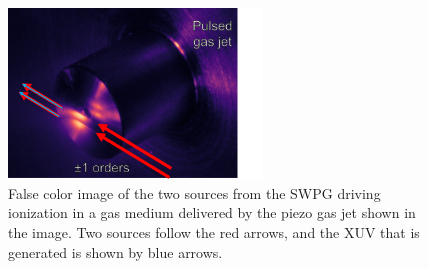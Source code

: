 \begin{figure}
	\centering
	\includegraphics[width=0.6\textwidth]{figures/Two_source/pulse_jet_ts.png}
	\caption{False color image of the two sources from the SWPG driving ionization in a gas medium delivered by the piezo gas jet shown in the image.  Two sources follow the red arrows, and the XUV that is generated is shown by blue arrows.}
	\label{fig:piezo_jet}
\end{figure}

